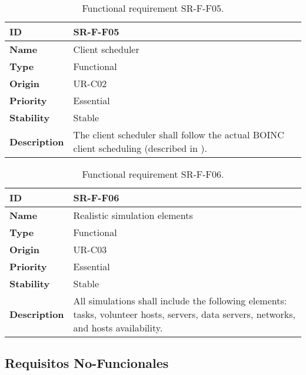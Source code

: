 \begin{center}
\begin{table*}[htbp]
\centering
\begin{tabular}{@{}p{2.5cm} p{9cm}@{}} 
\toprule
\textbf{ID} 				& SR-F-F05\\
\midrule
\textbf{Name} 			& Client scheduler \\
\midrule
\textbf{Type} 			& Functional \\
\midrule
\textbf{Origin} 			& UR-C02 \\
\midrule
\textbf{Priority}		& Essential \\
\midrule
\textbf{Stability} 		& Stable \\
\midrule
\textbf{Description} 	& The client scheduler shall follow the actual BOINC client \gls{scheduling} (described in \cite{anderson2007}). \\
\bottomrule
\end{tabular}
\caption{Functional requirement SR-F-F05.}
\label{tab:srff05}
\end{table*}
\end{center}

\begin{center}
\begin{table*}[htbp]
\centering
\begin{tabular}{@{}p{2.5cm} p{9cm}@{}} 
\toprule
\textbf{ID} 				& SR-F-F06\\
\midrule
\textbf{Name} 			& Realistic simulation elements \\
\midrule
\textbf{Type} 			& Functional \\
\midrule
\textbf{Origin} 			& UR-C03 \\
\midrule
\textbf{Priority}		& Essential \\
\midrule
\textbf{Stability} 		& Stable \\
\midrule
\textbf{Description} 	& All simulations shall include the following elements: tasks, volunteer hosts, servers, data servers, networks, and hosts availability. \\
\bottomrule
\end{tabular}
\caption{Functional requirement SR-F-F06.}
\label{tab:srff06}
\end{table*}
\end{center}


\subsection{Requisitos No-Funcionales}

